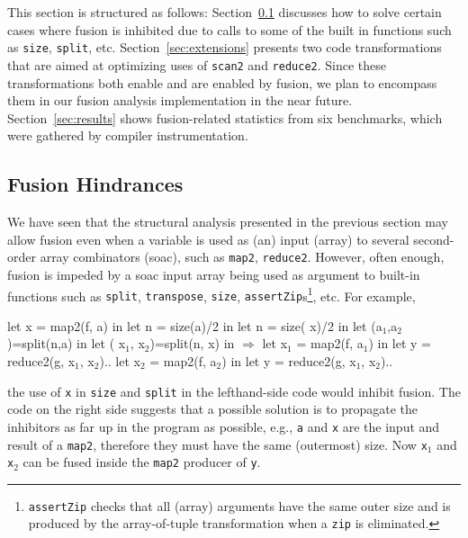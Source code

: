 \documentclass{sigplanconf}  %
\newcommand{\emp}[1]{\textcolor{DikuRed}{ #1}}
\newcommand{\emphh}[1]{\textcolor{CosGreen}{ #1}}
\newcommand{\mymath}[1]{$ #1 $}
\newcommand{\myindx}[1]{_{#1}}
\begin{document}
This section is structured as follows:
Section~\ref{sec:inhibitors} discusses how to
solve certain cases where fusion is inhibited due to calls
to some of the built in functions such as {\tt size}, {\tt split}, etc.
Section~\ref{sec:extensions} presents two code transformations that
are aimed at optimizing uses of {\tt scan2} and {\tt reduce2}. 
Since these transformations both enable and are enabled by fusion,
we plan to encompass them in our fusion analysis implementation in the
near future.
Section~\ref{sec:results} shows fusion-related statistics
from six benchmarks, which were gathered by compiler instrumentation.

\subsection{Fusion Hindrances}
\label{sec:inhibitors}

We have seen that the structural analysis presented in the previous section
may allow fusion even when a variable is used as (an) input (array) to several
second-order array combinators ({\sc soac}), such as {\tt map2}, {\tt reduce2}.
However, often enough, fusion is impeded by a {\sc soac} input array being
used as argument to built-in functions such as {\tt split}, {\tt transpose},
{\tt size}, {\tt assertZip}s\footnote{
{\tt assertZip} checks that all (array) arguments have the same outer size 
and is produced by the array-of-tuple transformation when a {\tt zip} is
eliminated.
}, etc.   For example,
\begin{colorcode}
let \emphh{x} = map2(f, a)      in    let n = size(a)/2      in
let n = size(\emp{x})/2       in    let (a\mymath{\myindx{1}},a\mymath{\myindx{2}})=split(n,a) in 
let (\emphh{x\mymath{\myindx{1}}},\emphh{x\mymath{\myindx{2}}})=split(n,\emp{x})  in \mymath{\Rightarrow} let \emphh{x\mymath{\myindx{1}}} = map2(f, a\mymath{\myindx{1}})   in
let y = reduce2(g,\emphh{x\mymath{\myindx{1}}},\emphh{x\mymath{\myindx{2}}})..    let \emphh{x\mymath{\myindx{2}}} = map2(f, a\mymath{\myindx{2}})   in
                              let y = reduce2(g,\emphh{x\mymath{\myindx{1}}},\emphh{x\mymath{\myindx{2}}})..
\end{colorcode}
the use of {\tt x} in {\tt size} and {\tt split} in the lefthand-side code 
would inhibit fusion.
The code on the right side suggests that a possible solution is to propagate 
the inhibitors as far up in the program as possible, e.g., {\tt a} and {\tt x} 
are the input and result of a {\tt map2}, therefore they must have the same 
(outermost) size. Now {\tt x$_1$} and {\tt x$_2$} can be fused inside the 
{\tt map2} producer of {\tt y}.
\end{document}
